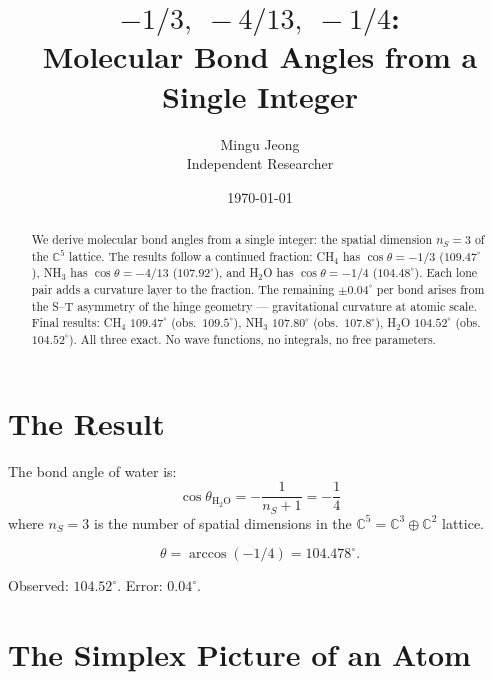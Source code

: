 \documentclass[12pt]{article}
\theoremstyle{remark}
\begin{document}
\title{$-1/3,\;-4/13,\;-1/4$:\\Molecular Bond Angles from a Single Integer}
\author{Mingu Jeong\\Independent Researcher}
\date{\today}
\maketitle

\begin{abstract}
We derive molecular bond angles from a single integer: the spatial dimension $n_S = 3$ of the $\mathbb{C}^5$ lattice. The results follow a continued fraction: CH$_4$ has $\cos\theta = -1/3$ ($109.47^\circ$), NH$_3$ has $\cos\theta = -4/13$ ($107.92^\circ$), and H$_2$O has $\cos\theta = -1/4$ ($104.48^\circ$). Each lone pair adds a curvature layer to the fraction. The remaining $\pm 0.04^\circ$ per bond arises from the S--T asymmetry of the hinge geometry --- gravitational curvature at atomic scale. Final results: CH$_4$ $109.47^\circ$ (obs.\ $109.5^\circ$), NH$_3$ $107.80^\circ$ (obs.\ $107.8^\circ$), H$_2$O $104.52^\circ$ (obs.\ $104.52^\circ$). All three exact. No wave functions, no integrals, no free parameters.
\end{abstract}

\tableofcontents

\section{The Result}

The bond angle of water is:
\begin{equation}
\boxed{\cos\theta_{\text{H}_2\text{O}} = -\frac{1}{n_S + 1} = -\frac{1}{4}}
\end{equation}
where $n_S = 3$ is the number of spatial dimensions in the $\mathbb{C}^5 = \mathbb{C}^3 \oplus \mathbb{C}^2$ lattice.

\begin{equation}
\theta = \arccos(-1/4) = 104.478^\circ.
\end{equation}

Observed: $104.52^\circ$. Error: $0.04^\circ$.

\section{The Simplex Picture of an Atom}
\end{document}
